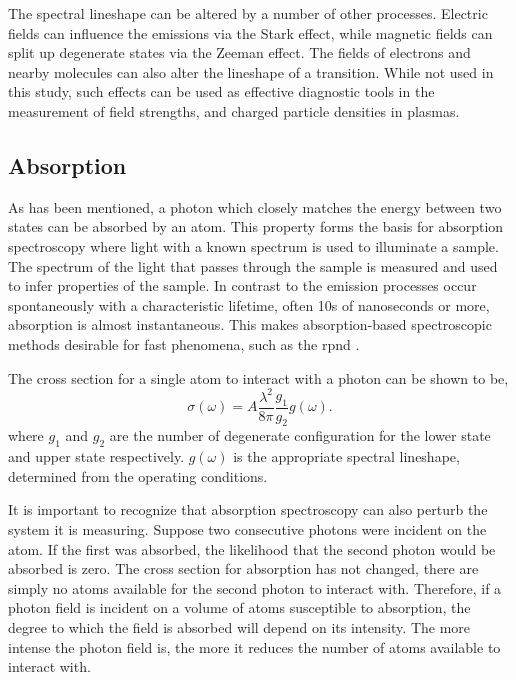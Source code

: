 The spectral lineshape can be altered by a number of other processes. Electric
fields can influence the emissions via the Stark effect, while magnetic fields
can split up degenerate states via the Zeeman effect. The fields of electrons
and nearby molecules can also alter the lineshape of a transition. While not
used in this study, such effects can be used as effective diagnostic tools in
the measurement of field strengths, and charged particle densities in plasmas.

\subsection{Absorption}

As has been mentioned, a photon which closely matches the energy between two
states can be absorbed by an atom. This property forms the basis for absorption
spectroscopy where light with a known spectrum is used to illuminate a sample.
The spectrum of the light that passes through the sample is measured and used to
infer properties of the sample. In contrast to the emission processes occur
spontaneously with a characteristic lifetime, often 10s of nanoseconds or more,
absorption is almost instantaneous. This makes absorption-based spectroscopic
methods desirable for fast phenomena, such as the \acs{rpnd}
\cite{Demtroder2008}.

The cross section for a single atom to interact with a photon can be shown
\cite{Siegman1986} to be,
\begin{equation}
  \sigma(\omega) = A \frac{\lambda^2}{8\pi}\frac{g_1}{g_2}g(\omega).
  \label{eq:absorb}
\end{equation}
where $g_1$ and $g_2$ are the number of degenerate configuration for the lower
state and upper state respectively. $g(\omega)$ is the appropriate spectral
lineshape, determined from the operating conditions.

It is important to recognize that absorption spectroscopy can also perturb the
system it is measuring. Suppose two consecutive photons were incident on the
atom. If the first was absorbed, the likelihood that the second photon would be
absorbed is zero. The cross section for absorption has not changed, there are
simply no atoms available for the second photon to interact with. Therefore, if
a photon field is incident on a volume of atoms susceptible to absorption, the
degree to which the field is absorbed will depend on its intensity. The more
intense the photon field is, the more it reduces the number of atoms available
to interact with.

